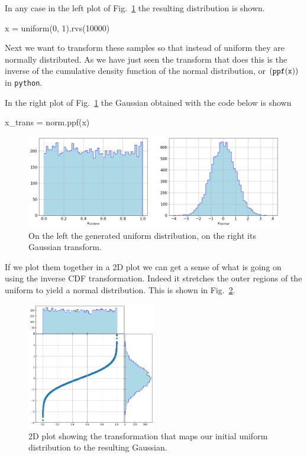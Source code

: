 In any case in the left plot of Fig.~\ref{fig:uniform_and_gauss} the resulting distribution is shown.

\begin{ipython}
x = uniform(0, 1).rvs(10000)
\end{ipython}

Next we want to transform these samples so that instead of uniform they
are normally distributed. As we have just seen the transform that does this
is the inverse of the cumulative density function of the normal 
distribution, or \((\tt{ppf(x))}\) in \texttt{python}. 

In the right plot of Fig.~\ref{fig:uniform_and_gauss} the Gaussian obtained 
with the code below is shown

\begin{ipython}
x_trans = norm.ppf(x)
\end{ipython}

\begin{figure}[htb]
	\centering
	\includegraphics[width=1.\textwidth]{figures/uniform_gauss.png}
	\caption{On the left the generated uniform distribution, on the right its Gaussian transform.}
	\label{fig:uniform_and_gauss}
\end{figure}

If we plot them together in a 2D plot we can get a sense of what is going on using the inverse CDF transformation. Indeed it stretches the outer regions of the uniform to yield a normal distribution. This is shown in Fig.~\ref{fig:uniform_to_gauss}. 
    
\begin{figure}[htbp]
  \centering
  \includegraphics[width=0.5\textwidth]{figures/lesson6_7_0.png}
  \caption{2D plot showing the transformation that maps our initial uniform distribution to the resulting Gaussian.}
  \label{fig:uniform_to_gauss}
\end{figure}
    
